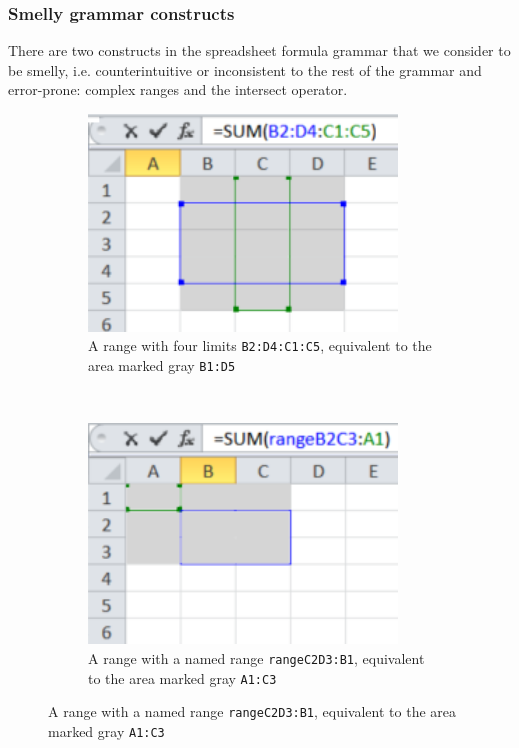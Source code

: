 \documentclass[conference]{IEEEtran}
\begin{document}
\subsubsection{Smelly grammar constructs}
There are two constructs in the spreadsheet formula grammar that we consider to be smelly, i.e. counterintuitive or inconsistent to the rest of the grammar and error-prone: complex ranges and the intersect operator.
\begin{figure}
	\centering
	\caption{Examples of references to complex ranges}\label{Figure:ComplexRanges}
	\begin{subfigure}[b]{0.4\textwidth}
		\centering
		\includegraphics[width=0.9\textwidth]{complexRanges}
		\vspace{0.0001mm}
		\caption{A range with four limits \texttt{B2:D4:C1:C5}, equivalent to the area marked gray \texttt{B1:D5}}
		\label{fig:complexA}
	\end{subfigure}
	~ %
	\begin{subfigure}[b]{0.4\textwidth}
		\centering
		\includegraphics[width=0.9\textwidth]{complexNamedRanges}
		\vspace{0.1mm}
		\caption{A range with a named range \texttt{rangeC2D3:B1}, equivalent to the area marked gray \texttt{A1:C3}}
		\label{fig:complexB}
	\end{subfigure}
\end{figure}
\end{document}
